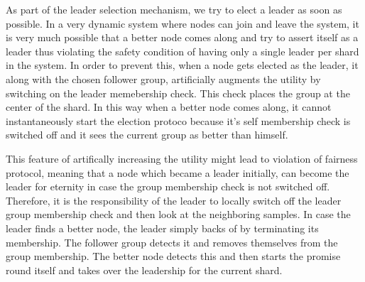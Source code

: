 \documentclass[a4paper, 11pt]{article}
\begin{document}
As part of the leader selection mechanism, we try to elect a leader as soon as possible. In a very dynamic system where nodes can join and leave the system, it is very much possible that a better node comes along and try to assert itself as a leader thus violating the safety condition of having only a single leader per shard in the system. In order to prevent this, when a node gets elected as the leader, it along with the chosen follower group, artificially augments the utility by switching on the leader memebership check. This check places the group at the center of the shard. In this way when a better node comes along, it cannot instantaneously start the election protoco because it's self membership check is switched off and it sees the current group as better than himself. 

\par This feature of artifically increasing the utility might lead to violation of fairness protocol, meaning that a node which became a leader initially, can become the leader for eternity in case the group membership check is not switched off. Therefore, it is the responsibility of the leader to locally switch off the leader group membership check and then look at the neighboring samples. In case the leader finds a better node, the leader simply backs of by terminating its membership. The follower group detects it and removes themselves from the group membership. The better node detects this and then starts the promise round itself and takes over the leadership for the current shard.
\end{document}
